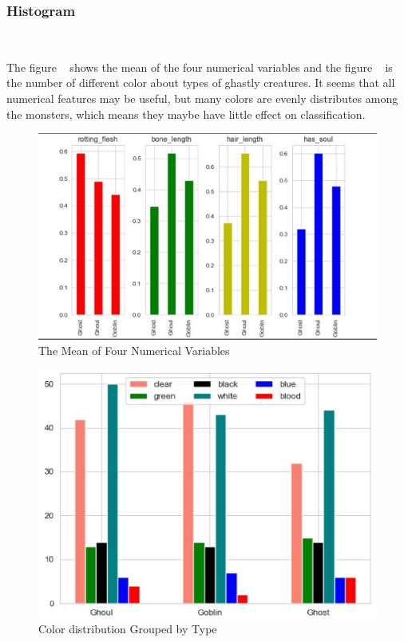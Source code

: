 \subsubsection{ Histogram}
\

The figure ~ 
shows the mean of the four numerical variables  
and the figure ~ 
is the number of different color 
about types of ghastly creatures.
It seems that all numerical features may be useful, 
but many colors are evenly distributes among the monsters,
which means they maybe have little effect on classification.


\begin{figure}[htbp]
	\centering
	
	\includegraphics[scale=0.3]{figures/his_1.eps}
	\caption{The Mean of Four Numerical Variables}\label{fig:his_1}
\end{figure}

\begin{figure}[htbp]
	\centering
	
	\includegraphics[scale=0.3]{figures/his_2.eps}
	\caption{Color distribution Grouped by Type}\label{fig:his_2}
\end{figure}


